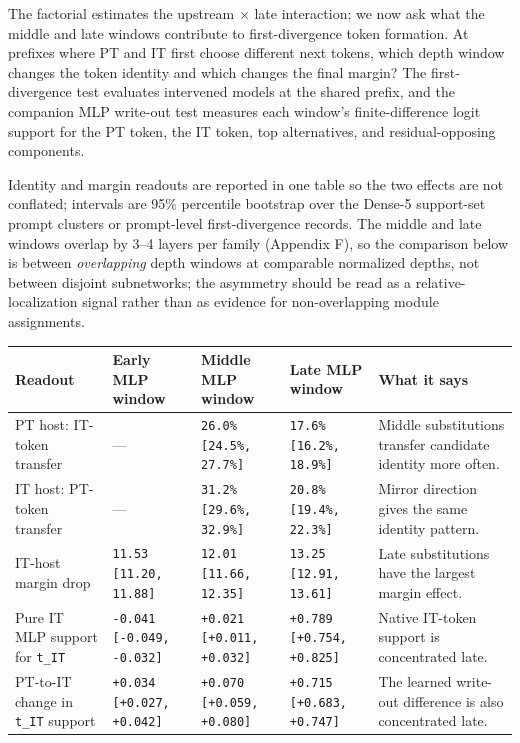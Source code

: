 \documentclass[11pt]{article}
\begin{document}
The factorial estimates the upstream \ensuremath{\times} late interaction; we now ask what the middle and late windows contribute to first-divergence token formation. At prefixes where PT and IT first choose different next tokens, which depth window changes the token identity and which changes the final margin? The first-divergence test evaluates intervened models at the shared prefix, and the companion MLP write-out test measures each window's finite-difference logit support for the PT token, the IT token, top alternatives, and residual-opposing components.

Identity and margin readouts are reported in one table so the two effects are not conflated; intervals are 95\% percentile bootstrap over the Dense-5 support-set prompt clusters or prompt-level first-divergence records. The middle and late windows overlap by 3--4 layers per family (Appendix F), so the comparison below is between \emph{overlapping} depth windows at comparable normalized depths, not between disjoint subnetworks; the asymmetry should be read as a relative-localization signal rather than as evidence for non-overlapping module assignments.

\begin{table}[t]
\centering
\small
\setlength{\tabcolsep}{3pt}
\begin{tabularx}{\linewidth}{@{}>{\raggedright\arraybackslash}X >{\raggedright\arraybackslash}X >{\raggedright\arraybackslash}X >{\raggedright\arraybackslash}X >{\raggedright\arraybackslash}X@{}}
\toprule
Readout & Early MLP window & Middle MLP window & Late MLP window & What it says \\
\midrule
PT host: IT-token transfer & --- & \texttt{26.0\%} \texttt{[24.5\%, 27.7\%]} & \texttt{17.6\%} \texttt{[16.2\%, 18.9\%]} & Middle substitutions transfer candidate identity more often. \\
IT host: PT-token transfer & --- & \texttt{31.2\%} \texttt{[29.6\%, 32.9\%]} & \texttt{20.8\%} \texttt{[19.4\%, 22.3\%]} & Mirror direction gives the same identity pattern. \\
IT-host margin drop & \texttt{11.53} \texttt{[11.20, 11.88]} & \texttt{12.01} \texttt{[11.66, 12.35]} & \texttt{13.25} \texttt{[12.91, 13.61]} & Late substitutions have the largest margin effect. \\
Pure IT MLP support for \texttt{t\_IT} & \texttt{-0.041} \texttt{[-0.049, -0.032]} & \texttt{+0.021} \texttt{[+0.011, +0.032]} & \texttt{+0.789} \texttt{[+0.754, +0.825]} & Native IT-token support is concentrated late. \\
PT-to-IT change in \texttt{t\_IT} support & \texttt{+0.034} \texttt{[+0.027, +0.042]} & \texttt{+0.070} \texttt{[+0.059, +0.080]} & \texttt{+0.715} \texttt{[+0.683, +0.747]} & The learned write-out difference is also concentrated late. \\
\bottomrule
\end{tabularx}
\end{table}
\end{document}
